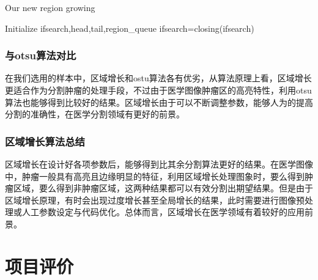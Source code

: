 \documentclass[UTF8]{ctexart}
\begin{document}
    \begin{algorithm}[H]
        \caption{Our new region growing}\label{algorithm}
        Initialize ifsearch,head,tail,region\_queue\;
        ifsearch=closing(ifsearch)
    \end{algorithm}


    \subsubsection{与otsu算法对比}

    在我们选用的样本中，区域增长和ostu算法各有优劣，从算法原理上看，区域增长更适合作为分割肿瘤的处理手段，不过由于医学图像肿瘤区的高亮特性，利用otsu算法也能够得到比较好的结果。区域增长由于可以不断调整参数，能够人为的提高分割的准确性，在医学分割领域有更好的前景。

    \subsubsection{区域增长算法总结}

	区域增长在设计好各项参数后，能够得到比其余分割算法更好的结果。在医学图像中，肿瘤一般具有高亮且边缘明显的特征，利用区域增长处理图象时，要么得到肿瘤区域，要么得到非肿瘤区域，这两种结果都可以有效分割出期望结果。但是由于区域增长原理，有时会出现过度增长甚至全局增长的结果，此时需要进行图像预处理或人工参数设定与代码优化。总体而言，区域增长在医学领域有着较好的应用前景。



\section{项目评价}
\end{document}
